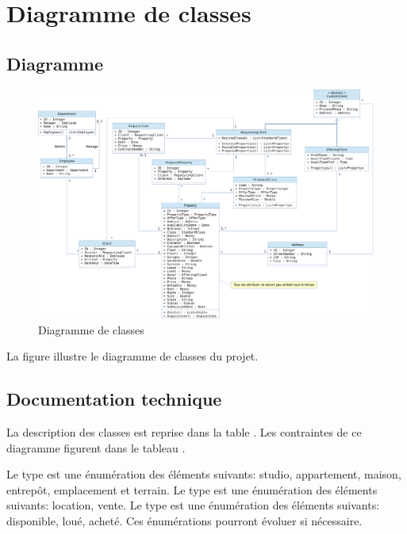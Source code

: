 \chapter{Diagramme de classes}

\section{Diagramme}

\begin{figure}
  \centering
  \includegraphics[angle=90,height=0.99\textheight]{IMG/cd}
  \caption{Diagramme de classes}
  \label{img_cd}
\end{figure}

La figure  illustre le diagramme de classes du projet.

\section{Documentation technique}

La description des classes est reprise dans la table . Les contraintes de ce diagramme figurent dans le tableau .

Le type  est une énumération des éléments suivants: \og{}studio\fg{}, \og{}appartement\fg{}, \og{}maison\fg{}, \og{}entrepôt\fg{}, \og{}emplacement\fg{} et \og{}terrain\fg{}. Le type  est une énumération des éléments suivants: \og{}location\fg{}, \og{}vente\fg{}. Le type  est une énumération des éléments suivants: \og{}disponible\fg{}, \og{}loué\fg{}, \og{}acheté\fg{}. Ces énumérations pourront évoluer si nécessaire.

